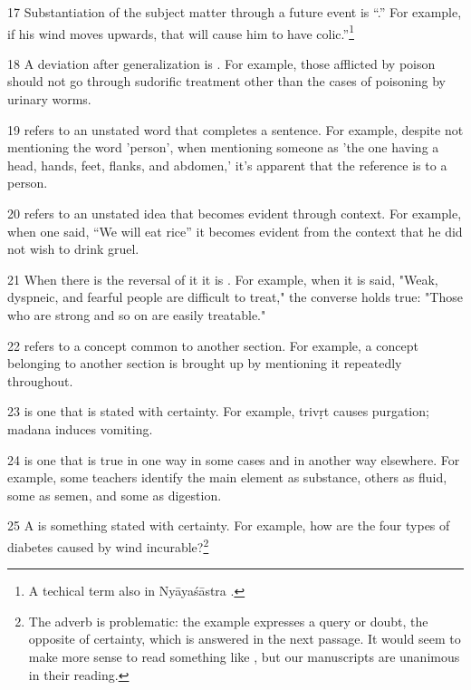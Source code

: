 \begin{translation}
\item [17] Substantiation of the subject matter through a future event is
“.” For example, if his wind moves upwards, that
will cause him to have colic.”\footnote{A techical term also in
    Nyāyaśāstra \citep[6--7]{jhal-1978}.}


\item [18] A deviation after generalization is . For example, those afflicted by poison should not go through sudorific treatment other than the cases of poisoning by urinary worms.

\item [19]  refers to an unstated word that completes a sentence. For example, despite not mentioning the word 'person', when mentioning someone as 'the one having a head, hands, feet, flanks, and abdomen,' it's apparent that the reference is to a person. 

\item [20]  refers to an unstated idea that becomes evident through context. For example, when one said, “We will eat rice” it becomes evident from the context that he did not wish to drink gruel. 

\item [21] When there is the reversal of it it is . For example, when it is said, "Weak, dyspneic, and fearful people are difficult to treat," the converse holds true: "Those who are strong and so on are easily treatable." 

\item [22]  refers to a concept common to another section. For example, a concept belonging to another section is brought up by mentioning it repeatedly throughout. 

\item [23]  is one that is stated with certainty. For example, \gls{trivṛt} causes purgation; \gls{madana} induces vomiting.

\item [24]  is one that is true in one way in 
some cases and in another way elsewhere. For example, some teachers identify 
the main element as substance, others as fluid, some as semen, and some as 
digestion.

\item [25]  A  is something stated
with certainty.  For example, how are the four types of diabetes caused
by wind incurable?\footnote{The adverb  is problematic:
    the example expresses a query or doubt, the opposite of certainty, which
    is answered in the next passage.  It would seem to make more sense to
    read something like ,
    but our manuscripts are unanimous in their reading.}


\end{translation}
